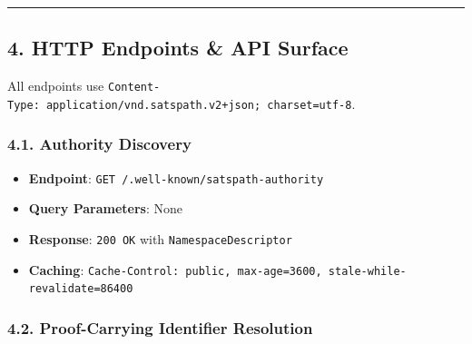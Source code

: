 \documentclass[
]{article}
\providecommand{\tightlist}{%
  \setlength{\itemsep}{0pt}\setlength{\parskip}{0pt}}
\begin{document}
\begin{center}\rule{0.5\linewidth}{0.5pt}\end{center}

\hypertarget{http-endpoints-api-surface}{%
\subsection{4. HTTP Endpoints \& API
Surface}\label{http-endpoints-api-surface}}

All endpoints use
\texttt{Content-Type:\ application/vnd.satspath.v2+json;\ charset=utf-8}.

\hypertarget{authority-discovery}{%
\subsubsection{4.1. Authority Discovery}\label{authority-discovery}}

\begin{itemize}
\tightlist
\item
  \textbf{Endpoint}: \texttt{GET\ /.well-known/satspath-authority}
\item
  \textbf{Query Parameters}: None
\item
  \textbf{Response}: \texttt{200\ OK} with \texttt{NamespaceDescriptor}
\item
  \textbf{Caching}:
  \texttt{Cache-Control:\ public,\ max-age=3600,\ stale-while-revalidate=86400}
\end{itemize}

\hypertarget{proof-carrying-identifier-resolution}{%
\subsubsection{4.2. Proof-Carrying Identifier
Resolution}\label{proof-carrying-identifier-resolution}}
\end{document}

